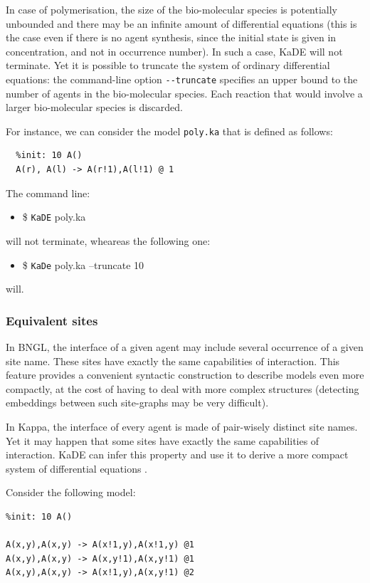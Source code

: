 \documentclass[11pt]{book}
\def\KaDE{\textsf{KaDE}}
\def\ttt#1{\texttt{#1}}
\def\ITE#1{\begin{itemize}#1\end{itemize}}
\begin{document}
In case of polymerisation, the size of the bio-molecular species is potentially  unbounded and there may be an infinite amount of differential equations (this is the case even if there is no agent synthesis, since the initial state is given in concentration, and not in occurrence number). In such a case, {\KaDE} will not terminate. Yet it is possible to truncate the system of ordinary differential equations: the command-line option \texttt{-{}-truncate} specifies an upper bound to the number of agents in the bio-molecular species. Each reaction that would involve a larger bio-molecular species is discarded.

For instance, we can consider the model \texttt{poly.ka} that is defined as follows:
\begin{lstlisting}[language=kappa]
  %agent: A(l,r)
  %init: 10 A()
  A(r), A(l) -> A(r!1),A(l!1) @ 1
\end{lstlisting}

The command line:
\ITE{\item[\$] \ttt{KaDE} poly.ka}
will not terminate, wheareas the following one:
\ITE{\item[\$] \ttt{KaDe} poly.ka --truncate 10}
will.


\subsubsection{Equivalent sites}
\label{sec:kade:ex}
In BNGL, the interface of a given agent may include several occurrence of a given site name. These sites have exactly the same capabilities of interaction. This feature provides a convenient syntactic construction to describe models even more compactly, at the cost of having to deal with more complex structures (detecting embeddings between such site-graphs may be very difficult).

In Kappa, the interface of every agent is made of pair-wisely distinct site names. Yet it may happen that some sites have exactly the same capabilities of interaction. {\KaDE} can infer this property and use it to derive a more compact system of differential equations \cite{Feret-MFPSXXVII,CAMPORESI201073,Feret201545}.


Consider the following model:
\begin{lstlisting}[language=kappa]
%agent: A(x,y)
%init: 10 A()

A(x,y),A(x,y) -> A(x!1,y),A(x!1,y) @1
A(x,y),A(x,y) -> A(x,y!1),A(x,y!1) @1
A(x,y),A(x,y) -> A(x!1,y),A(x,y!1) @2
\end{lstlisting}
\end{document}
